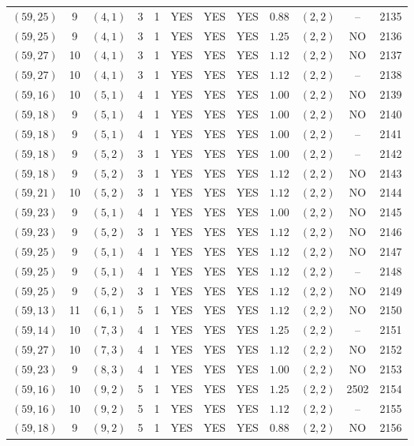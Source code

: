 \begin{longtable}{|c|c|c|c|c|c|c|c|c|c|c|c|}
$(59,25)$ & 9 & $(4,1)$ & 3 & 1 & YES & YES & YES & $0.88$ & $(2,2)$ & -- & 2135\\
$(59,25)$ & 9 & $(4,1)$ & 3 & 1 & YES & YES & YES & $1.25$ & $(2,2)$ & NO & 2136\\
$(59,27)$ & 10 & $(4,1)$ & 3 & 1 & YES & YES & YES & $1.12$ & $(2,2)$ & NO & 2137\\
$(59,27)$ & 10 & $(4,1)$ & 3 & 1 & YES & YES & YES & $1.12$ & $(2,2)$ & -- & 2138\\
$(59,16)$ & 10 & $(5,1)$ & 4 & 1 & YES & YES & YES & $1.00$ & $(2,2)$ & NO & 2139\\
$(59,18)$ & 9 & $(5,1)$ & 4 & 1 & YES & YES & YES & $1.00$ & $(2,2)$ & NO & 2140\\
$(59,18)$ & 9 & $(5,1)$ & 4 & 1 & YES & YES & YES & $1.00$ & $(2,2)$ & -- & 2141\\
$(59,18)$ & 9 & $(5,2)$ & 3 & 1 & YES & YES & YES & $1.00$ & $(2,2)$ & -- & 2142\\
$(59,18)$ & 9 & $(5,2)$ & 3 & 1 & YES & YES & YES & $1.12$ & $(2,2)$ & NO & 2143\\
$(59,21)$ & 10 & $(5,2)$ & 3 & 1 & YES & YES & YES & $1.12$ & $(2,2)$ & NO & 2144\\
$(59,23)$ & 9 & $(5,1)$ & 4 & 1 & YES & YES & YES & $1.00$ & $(2,2)$ & NO & 2145\\
$(59,23)$ & 9 & $(5,2)$ & 3 & 1 & YES & YES & YES & $1.12$ & $(2,2)$ & NO & 2146\\
$(59,25)$ & 9 & $(5,1)$ & 4 & 1 & YES & YES & YES & $1.12$ & $(2,2)$ & NO & 2147\\
$(59,25)$ & 9 & $(5,1)$ & 4 & 1 & YES & YES & YES & $1.12$ & $(2,2)$ & -- & 2148\\
$(59,25)$ & 9 & $(5,2)$ & 3 & 1 & YES & YES & YES & $1.12$ & $(2,2)$ & NO & 2149\\
$(59,13)$ & 11 & $(6,1)$ & 5 & 1 & YES & YES & YES & $1.12$ & $(2,2)$ & NO & 2150\\
$(59,14)$ & 10 & $(7,3)$ & 4 & 1 & YES & YES & YES & $1.25$ & $(2,2)$ & -- & 2151\\
$(59,27)$ & 10 & $(7,3)$ & 4 & 1 & YES & YES & YES & $1.12$ & $(2,2)$ & NO & 2152\\
$(59,23)$ & 9 & $(8,3)$ & 4 & 1 & YES & YES & YES & $1.00$ & $(2,2)$ & NO & 2153\\
$(59,16)$ & 10 & $(9,2)$ & 5 & 1 & YES & YES & YES & $1.25$ & $(2,2)$ & 2502 & 2154\\
$(59,16)$ & 10 & $(9,2)$ & 5 & 1 & YES & YES & YES & $1.12$ & $(2,2)$ & -- & 2155\\
$(59,18)$ & 9 & $(9,2)$ & 5 & 1 & YES & YES & YES & $0.88$ & $(2,2)$ & NO & 2156\\

\end{longtable}
